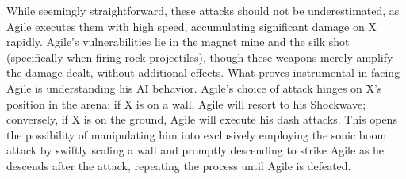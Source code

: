 While seemingly straightforward, these attacks should not be underestimated, as Agile executes them with high speed, accumulating significant damage on X rapidly. Agile's vulnerabilities lie in the magnet mine and the silk shot (specifically when firing rock projectiles), though these weapons merely amplify the damage dealt, without additional effects. What proves instrumental in facing Agile is understanding his AI behavior. Agile's choice of attack hinges on X's position in the arena: if X is on a wall, Agile will resort to his Shockwave; conversely, if X is on the ground, Agile will execute his dash attacks. This opens the possibility of manipulating him into exclusively employing the sonic boom attack by swiftly scaling a wall and promptly descending to strike Agile as he descends after the attack, repeating the process until Agile is defeated.


